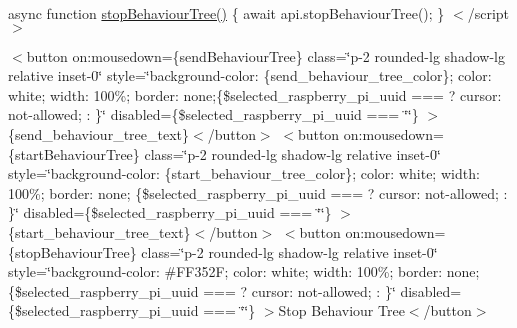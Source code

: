 async function \mbox{\hyperlink{behaviour__tree_8js_a918578916851725276d5212a9646aec4}{stop\+Behaviour\+Tree()}} \{ await api.\+stop\+Behaviour\+Tree(); \} $<$/script$>$

 \texorpdfstring{$<$}{<}button on\+:mousedown=\{send\+Behaviour\+Tree\} class=\char`\"{}p-\/2 rounded-\/lg shadow-\/lg relative inset-\/0\char`\"{} style=\char`\"{}background-\/color\+: \{send\+\_\+behaviour\+\_\+tree\+\_\+color\}; color\+: white; width\+: 100\%; border\+: none;\{\$selected\+\_\+raspberry\+\_\+pi\+\_\+uuid ===         \textquotesingle{}\textquotesingle{}             ? \textquotesingle{}cursor\+: not-\/allowed;\textquotesingle{}             \+: \textquotesingle{}\textquotesingle{}\}\char`\"{} disabled=\{\$selected\+\_\+raspberry\+\_\+pi\+\_\+uuid === \char`\"{}\char`\"{}\} \texorpdfstring{$>$}{>}\{send\+\_\+behaviour\+\_\+tree\+\_\+text\}$<$/button$>$ \texorpdfstring{$<$}{<}button on\+:mousedown=\{start\+Behaviour\+Tree\} class=\char`\"{}p-\/2 rounded-\/lg shadow-\/lg relative inset-\/0\char`\"{} style=\char`\"{}background-\/color\+: \{start\+\_\+behaviour\+\_\+tree\+\_\+color\}; color\+: white; width\+: 100\%; border\+: none; \{\$selected\+\_\+raspberry\+\_\+pi\+\_\+uuid ===         \textquotesingle{}\textquotesingle{}             ? \textquotesingle{}cursor\+: not-\/allowed;\textquotesingle{}             \+: \textquotesingle{}\textquotesingle{}\}\char`\"{} disabled=\{\$selected\+\_\+raspberry\+\_\+pi\+\_\+uuid === \char`\"{}\char`\"{}\} \texorpdfstring{$>$}{>}\{start\+\_\+behaviour\+\_\+tree\+\_\+text\}$<$/button$>$ \texorpdfstring{$<$}{<}button on\+:mousedown=\{stop\+Behaviour\+Tree\} class=\char`\"{}p-\/2 rounded-\/lg shadow-\/lg relative inset-\/0\char`\"{} style=\char`\"{}background-\/color\+: \#\+FF352\+F; color\+: white; width\+: 100\%; border\+: none; \{\$selected\+\_\+raspberry\+\_\+pi\+\_\+uuid ===         \textquotesingle{}\textquotesingle{}             ? \textquotesingle{}cursor\+: not-\/allowed;\textquotesingle{}             \+: \textquotesingle{}\textquotesingle{}\}\char`\"{} disabled=\{\$selected\+\_\+raspberry\+\_\+pi\+\_\+uuid === \char`\"{}\char`\"{}\} \texorpdfstring{$>$}{>}Stop Behaviour Tree$<$/button$>$  